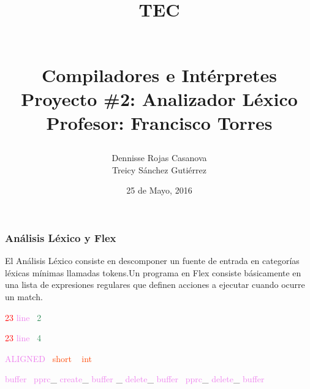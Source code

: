 \documentclass[8, usernames, dvipsnames]{beamer}
\begin{document}
 
\title{
\begin{Large}
TEC
\end{Large}
\newline
\begin{Large}
\\Compiladores e Int\'erpretes
\\Proyecto \#2: Analizador L\'exico
\\Profesor: Francisco Torres
\end{Large}
}
\author{Dennisse Rojas Casanova
\\Treicy S\'anchez Guti\'errez}
\date{25 de Mayo, 2016}
\maketitle 
\begin{frame} 
\frametitle{An\'alisis L\'exico y Flex} 
El An\'alisis L\'exico consiste en descomponer un fuente de entrada en categor\'ias l\'exicas m\'inimas llamadas tokens.Un programa en Flex consiste b\'asicamente en una lista de expresiones regulares que definen acciones a ejecutar cuando ocurre un match.\end{frame} 
\begin{frame}
 \textcolor{Red}{23}
\textcolor{Violet}{line}\textcolor{White}{\ }
\textcolor{SeaGreen}{2}
\textcolor{White}{\ }

 
  \textcolor{Red}{23}
\textcolor{Violet}{line}\textcolor{White}{\ }
\textcolor{SeaGreen}{4}
\textcolor{White}{\ }

 
 \textcolor{Violet}{ALIGNED}\textcolor{White}{\ }
\textcolor{OrangeRed}{short}
\textcolor{White}{\ }
\textcolor{OrangeRed}{int}

 
 
 
 \textcolor{Violet}{buffer}\textcolor{White}{\ }
\textcolor{Violet}{pprc}\textcolor{Sepia}{\_}
\textcolor{Violet}{create}\textcolor{Sepia}{\_}
\textcolor{Violet}{buffer}
 \textcolor{Sepia}{\_}
\textcolor{Violet}{delete}\textcolor{Sepia}{\_}
\textcolor{Violet}{buffer}\textcolor{White}{\ }
\textcolor{Violet}{pprc}\textcolor{Sepia}{\_}
\textcolor{Violet}{delete}\textcolor{Sepia}{\_}
\textcolor{Violet}{buffer}
 \end{frame}
\end{document}
